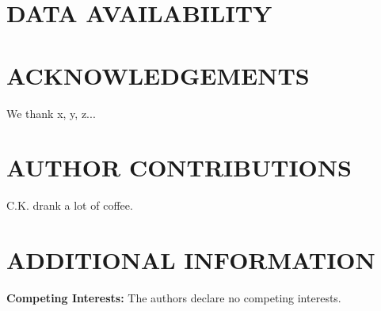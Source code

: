 \documentclass[prd,twocolumn,tightenlines,preprintnumbers,showpacs,superscriptaddress,notitlepage,nofootinbib,eqsecnum,floatfix,longbibliography,aps,10pt]{revtex4-2}
\begin{document}


\section{DATA AVAILABILITY}
\label{sec:open-source}


\section{ACKNOWLEDGEMENTS}

We thank x, y, z...

\section{AUTHOR CONTRIBUTIONS}

C.K. drank a lot of coffee.

\section{ADDITIONAL INFORMATION}

\textbf{Competing Interests:} The authors declare no competing interests.



\end{document}
